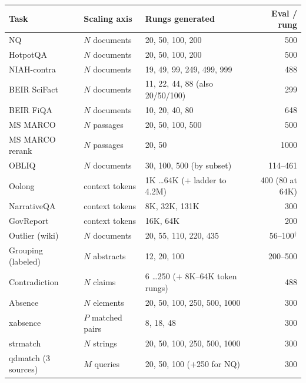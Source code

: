 \begin{table}[h]
\centering
\small
\setlength{\tabcolsep}{4pt}
\begin{tabular}{@{}l l l r@{}}
\toprule
\textbf{Task} & \textbf{Scaling axis} & \textbf{Rungs generated} & \textbf{Eval / rung} \\
\midrule
NQ                 & $N$ documents      & 20, 50, 100, 200                & 500 \\
HotpotQA           & $N$ documents      & 20, 50, 100, 200                & 500 \\
NIAH-contra        & $N$ documents      & 19, 49, 99, 249, 499, 999       & 488 \\
BEIR SciFact       & $N$ documents      & 11, 22, 44, 88 (also 20/50/100) & 299 \\
BEIR FiQA          & $N$ documents      & 10, 20, 40, 80                  & 648 \\
MS MARCO           & $N$ passages       & 20, 50, 100, 500                & 500 \\
MS MARCO rerank    & $N$ passages       & 20, 50                          & 1000 \\
OBLIQ              & $N$ documents      & 30, 100, 500 (by subset)        & 114--461 \\
Oolong             & context tokens     & 1K \dots 64K ($+$ ladder to 4.2M) & 400 (80 at 64K) \\
NarrativeQA        & context tokens     & 8K, 32K, 131K                   & 300 \\
GovReport          & context tokens     & 16K, 64K                        & 200 \\
\midrule
Outlier (wiki)     & $N$ documents      & 20, 55, 110, 220, 435           & 56--100$^\dagger$ \\
Grouping (labeled) & $N$ abstracts      & 12, 20, 100                     & 200--500 \\
\midrule
Contradiction      & $N$ claims         & 6 \dots 250 ($+$ 8K--64K token rungs) & 488 \\
Absence            & $N$ elements       & 20, 50, 100, 250, 500, 1000     & 300 \\
xabsence           & $P$ matched pairs  & 8, 18, 48                       & 300 \\
strmatch           & $N$ strings        & 20, 50, 100, 250, 500, 1000     & 300 \\
qdmatch (3 sources)& $M$ queries        & 20, 50, 100 ($+$250 for NQ)     & 300 \\

\end{tabular}
\end{table}
